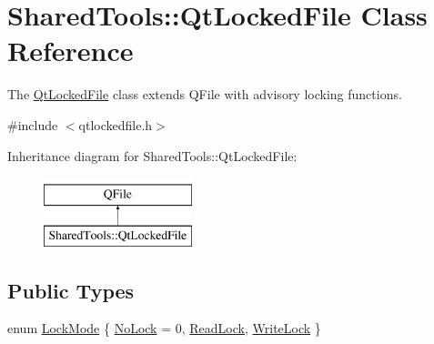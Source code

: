\hypertarget{class_shared_tools_1_1_qt_locked_file}{\section{Shared\-Tools\-:\-:Qt\-Locked\-File Class Reference}
\label{class_shared_tools_1_1_qt_locked_file}
}


The \hyperlink{class_shared_tools_1_1_qt_locked_file}{Qt\-Locked\-File} class extends Q\-File with advisory locking functions.  




{\ttfamily \#include $<$qtlockedfile.\-h$>$}

Inheritance diagram for Shared\-Tools\-:\-:Qt\-Locked\-File\-:\begin{figure}[H]
\begin{center}
\leavevmode
\includegraphics[height=2.000000cm]{class_shared_tools_1_1_qt_locked_file}
\end{center}
\end{figure}
\subsection*{Public Types}
\begin{DoxyCompactItemize}
\item 
enum \hyperlink{class_shared_tools_1_1_qt_locked_file_aaa69b096bf94afaae92f0ebcec10f2ed}{Lock\-Mode} \{ \hyperlink{class_shared_tools_1_1_qt_locked_file_aaa69b096bf94afaae92f0ebcec10f2edaef56306bfebfe99d2a8e7caad9a1de65}{No\-Lock} = 0, 
\hyperlink{class_shared_tools_1_1_qt_locked_file_aaa69b096bf94afaae92f0ebcec10f2eda9729b3d3f240074ed63626e285af2b75}{Read\-Lock}, 
\hyperlink{class_shared_tools_1_1_qt_locked_file_aaa69b096bf94afaae92f0ebcec10f2eda8435c3fea5ef1733bd3a8a792227a9c5}{Write\-Lock}
 \}
\end{DoxyCompactItemize}
